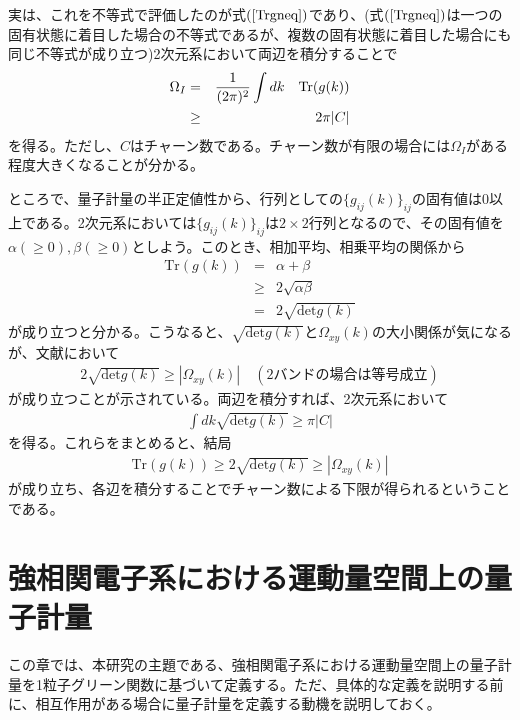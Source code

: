 \documentclass[12pt]{jsbook}
\begin{document}
実は、これを不等式で評価したのが式$(\ref{Trgneq})$であり、(式$(\ref{Trgneq})$は一つの固有状態に着目した場合の不等式であるが、複数の固有状態に着目した場合にも同じ不等式が成り立つ)2次元系において両辺を積分することで
\begin{eqnarray}
    \Omega_I &=& {1\over (2\pi)^2}\int dk\quad \mathrm{Tr}(g(k))\\
    &\geq& 2\pi |C|
\end{eqnarray}
を得る。ただし、$C$はチャーン数である。チャーン数が有限の場合には$\Omega_I$がある程度大きくなることが分かる。

ところで、量子計量の半正定値性から、行列としての$\{g_{ij}(k)\}_{ij}$の固有値は$0$以上である。2次元系においては$\{g_{ij}(k)\}_{ij}$は$2\times 2$行列となるので、その固有値を$\alpha(\geq 0),\beta(\geq 0)$としよう。このとき、相加平均、相乗平均の関係から
\begin{eqnarray}
    \mathrm{Tr}(g(k))&=&\alpha +\beta\\
    &\geq&2\sqrt{\alpha\beta}\\
    &=&2\sqrt{\mathrm{det}g(k)}
\end{eqnarray}
が成り立つと分かる。こうなると、$\sqrt{\mathrm{det}g(k)}$と$\Omega_{xy}(k)$の大小関係が気になるが、文献\cite{ozawa2021relations}において
\begin{eqnarray}
    2\sqrt{\mathrm{det}g(k)}\geq |\Omega_{xy}(k)| \quad (2バンドの場合は等号成立)
\end{eqnarray}
が成り立つことが示されている。両辺を積分すれば、2次元系において
\begin{eqnarray}
    \int dk \sqrt{\mathrm{det}g(k)}\geq \pi |C|
\end{eqnarray}
を得る。これらをまとめると、結局
\begin{eqnarray}
    \mathrm{Tr}(g(k))\geq 2\sqrt{\mathrm{det}g(k)}\geq |\Omega_{xy}(k)|
\end{eqnarray}
が成り立ち、各辺を積分することでチャーン数による下限が得られるということである。
\chapter{強相関電子系における運動量空間上の量子計量}
この章では、本研究の主題である、強相関電子系における運動量空間上の量子計量を1粒子グリーン関数に基づいて定義する。ただ、具体的な定義を説明する前に、相互作用がある場合に量子計量を定義する動機を説明しておく。
\end{document}

